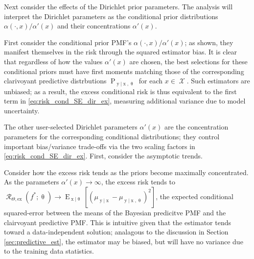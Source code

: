 \documentclass[12pt]{article}
\DeclareMathOperator{\xrm}{\mathrm{x}}
\DeclareMathOperator{\yrm}{\mathrm{y}}
\DeclareMathOperator{\Prm}{\mathrm{P}}
\DeclareMathOperator{\Erm}{\mathrm{E}}
\DeclareMathOperator{\Xcal}{\mathcal{X}}
\DeclareMathOperator{\Rcal}{\mathcal{R}}
\begin{document}
Next consider the effects of the Dirichlet prior parameters. The analysis will interpret the Dirichlet parameters as the conditional prior distributions $\alpha(\cdot,x)/\alpha'(x)$ and their concentrations $\alpha'(x)$. 

First consider the conditional prior PMF's $\alpha(\cdot,x) / \alpha'(x)$; as shown, they manifest themselves in the risk through the squared estimator bias. It is clear that regardless of how the values $\alpha'(x)$ are chosen, the best selections for these conditional priors must have first moments matching those of the corresponding clarivoyant predictive distrbutions $\Prm_{\yrm | \xrm,\uptheta}$ for each $x \in \Xcal$. Such estimators are unbiased; as a result, the excess conditional risk is thus equivalent to the first term in \eqref{eq:risk_cond_SE_dir_ex}, measuring additional variance due to model uncertainty.



The other user-selected Dirichlet parameters $\alpha'(x)$ are the concentration parameters for the corresponding conditional distributions; they control important bias/variance trade-offs via the two scaling factors in \eqref{eq:risk_cond_SE_dir_ex}. First, consider the asymptotic trends.

Consider how the excess risk tends as the priors become maximally concentrated. As the parameters $\alpha'(x) \to \infty$, the excess risk tends to $\Rcal_{\Theta, \mathrm{ex}}(f^* ; \uptheta) \to \Erm_{\xrm | \uptheta}\left[ \left( \mu_{\yrm | \xrm} - \mu_{\yrm | \xrm,\uptheta} \right)^2 \right]$, the expected conditional squared-error between the means of the Bayesian predicitve PMF and the clairvoyant predictive PMF. This is intuitive given that the estimator tends toward a data-independent solution; analagous to the discussion in Section \ref{sec:predictive_est}, the estimator may be biased, but will have no variance due to the training data statistics.
\end{document}
